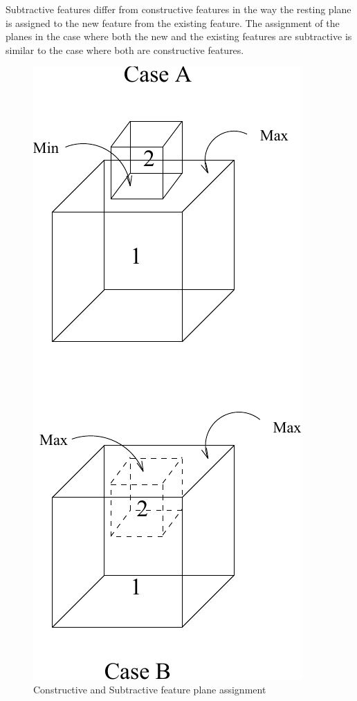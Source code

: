 	Subtractive features differ from constructive features in the way the
	resting plane is assigned to the new feature from the existing feature.
	The assignment of the planes in the case where both the new and the
	existing features are subtractive is similar to the case where both are
	constructive features.


        \begin{figure}[htbp]
	\hspace{2.5cm}	
	\includegraphics{ADDSUB.pdf}
            \caption{Constructive and Subtractive feature plane assignment}
            \label{addsub}
        \end{figure}

